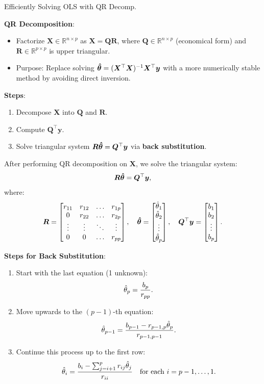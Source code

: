 \documentclass[11pt,compress,t,notes=noshow, xcolor=table]{beamer}
\begin{document}
\begin{vbframe}{Efficiently Solving OLS with QR Decomp.}

\textbf{QR Decomposition}:
\begin{itemize}
    \item Factorize \( \bm{X} \in \mathbb{R}^{n \times p} \) as \( \bm{X} = \bm{Q}\bm{R} \), where \( \bm{Q} \in \mathbb{R}^{n \times p} \) (economical form) and \( \bm{R} \in \mathbb{R}^{p \times p} \) is upper triangular.
    \item Purpose: Replace solving \( \bm{\hat{\theta}} = (\bm{X}^{\top} \bm{X})^{-1} \bm{X}^{\top} \bm{y} \) with a more numerically stable method by avoiding direct inversion.
\end{itemize}

\textbf{Steps}:
\begin{enumerate}
    \item Decompose \( \bm{X} \) into \( \bm{Q} \) and \( \bm{R} \).
    \item Compute \( \bm{Q}^{\top} \bm{y} \).
    \item Solve triangular system \( \bm{R} \bm{\hat{\theta}} = \bm{Q}^{\top} \bm{y} \) via \textbf{back substitution}.
\end{enumerate}

After performing QR decomposition on \( \bm{X} \), we solve the triangular system:
\[
\bm{R} \bm{\hat{\theta}} = \bm{Q}^{\top} \bm{y},
\]
where:
\[
\bm{R} = \begin{bmatrix} 
r_{11} & r_{12} & \dots & r_{1p} \\ 
0 & r_{22} & \dots & r_{2p} \\ 
\vdots & \vdots & \ddots & \vdots \\ 
0 & 0 & \dots & r_{pp} 
\end{bmatrix}, \quad 
\bm{\hat{\theta}} = \begin{bmatrix} 
\hat{\theta}_1 \\ 
\hat{\theta}_2 \\ 
\vdots \\ 
\hat{\theta}_p 
\end{bmatrix}, \quad \bm{Q}^{\top} \bm{y} = \begin{bmatrix} 
b_1 \\ 
b_2 \\ 
\vdots \\ 
b_p 
\end{bmatrix}.
\]

\textbf{Steps for Back Substitution}:
\begin{enumerate}
    \item Start with the last equation (1 unknown):
          \[
          \hat{\theta}_p = \frac{b_p}{r_{pp}}.
          \]
    \item Move upwards to the \( (p-1) \)-th equation:
          \[
          \hat{\theta}_{p-1} = \frac{b_{p-1} - r_{p-1,p} \hat{\theta}_p}{r_{p-1,p-1}}.
          \]
    \item Continue this process up to the first row:
          \[
          \hat{\theta}_i = \frac{b_i - \sum_{j=i+1}^p r_{ij} \hat{\theta}_j}{r_{ii}} \quad \text{for each } i = p-1, \dots, 1.
          \]
\end{enumerate}


\end{vbframe}
\end{document}
